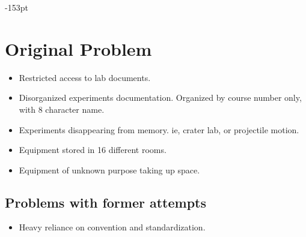 


\begin{adjustwidth}{}{-153pt}
\section{\bf Original Problem}

\begin{itemize}
	\item Restricted access to lab documents.
	\item Disorganized experiments documentation. Organized by course number only, with 8 character 		name.
	\item Experiments disappearing from memory. ie, crater lab, or projectile motion.
	\item Equipment stored in 16 different rooms.
	\item Equipment of unknown purpose taking up space.
\end{itemize}


\subsection{\bf Problems with former attempts}
\begin{itemize}
\item Heavy reliance on convention and standardization.
\end{itemize}



\end{adjustwidth}
